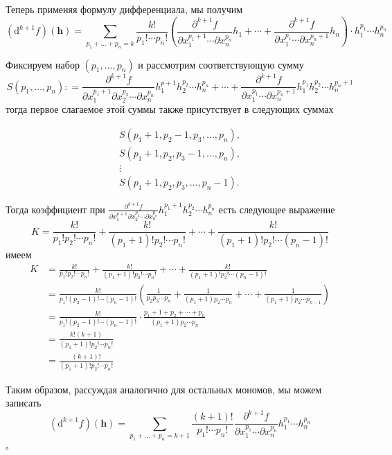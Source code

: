 \documentclass[a4paper]{article}
\newcommand{\qed}{\hfill$\square$}
\newcommand{\m}[1]{\mathbf{#1}}
\begin{document}
Теперь применяя формулу дифференциала, мы получим
$$
(\mathrm{d}^{k+1}f)(\m{h}) = \sum_{p_1 + \ldots + p_n = k} \dfrac{k!}{p_1! \cdots p_n!} \left( \frac{\partial^{k+1}f}{\partial x_1^{p_1+1} \cdots \partial x_n^{p_n}}h_1 + \cdots +  \frac{\partial^{k+1}f}{\partial x_1^{p_1} \cdots \partial x_n^{p_n+1}}h_n \right)\cdot h_1^{p_1}\cdots h_n^{p_n} 
$$

Фиксируем набор $(p_1,\ldots, p_n)$ и рассмотрим соответствующую сумму
$$
S(p_1,\ldots, p_n): = \frac{\partial^{k+1}f}{\partial x_1^{p_1+1} \partial x_2^{p_2} \cdots \partial x_n^{p_n}}h_1^{p+1}h_2^{p_2}\cdots h_n^{p_n} + \cdots +  \frac{\partial^{k+1}f}{\partial x_1^{p_1} \cdots \partial x_n^{p_n+1}}h_1^{p_1}h_2^{p_2} \cdots h_n^{p_n+1}
$$
тогда первое слагаемое этой суммы также присутствует в следующих суммах

$$
\begin{matrix}
S(p_1+1, p_2-1,p_3,\ldots, p_n), \\
S(p_1+1, p_2,p_3-1,\ldots, p_n), \\
\vdots \\
S(p_1+1, p_2,p_3,\ldots, p_n-1).
\end{matrix}
$$

Тогда коэффициент при $\frac{\partial^{k+1}f}{\partial x_1^{p+1}\partial x_2^{p_2} \cdots \partial x_n^{p_n}} h_1^{p_1+1}h_2^{p_2}\cdots h_n^{p_n}$ есть следующее выражение
$$
K = \frac{k!}{p_1! p_2! \cdots p_n!} + \frac{k!}{(p_1+1)!p_2! \cdots p_n!} + \cdots + \frac{k!}{(p_1+1)!p_2! \cdots (p_n-1)!}
$$
имеем
\begin{align*}
K &=   \frac{k!}{p_1! p_2! \cdots p_n!} + \frac{k!}{(p_1+1)!p_2! \cdots p_n!} + \cdots + \frac{k!}{(p_1+1)!p_2! \cdots (p_n-1)!} \\
&= \frac{k!}{p_1! (p_2-1)! \cdots (p_n-1)!}\left( \frac{1}{p_2p_3 \cdots p_n} + \frac{1}{(p_1+1)p_2\cdots p_n} + \cdots + \frac{1}{(p_1+1)p_2 \cdots p_{n-1}}\right) \\
&= \frac{k!}{p_1! (p_2-1)! \cdots (p_n-1)!} \cdot \frac{p_1+1 +p_2+ \cdots+ p_n}{(p_1+1)p_2\cdots p_n} \\
&= \frac{k!(k+1)}{(p_1+1)! p_2! \cdots p_n!} \\
&= \frac{(k+1)!}{(p_1+1)! p_2! \cdots p_n!}
\end{align*}

Таким образом, рассуждая аналогично для остальных мономов, мы можем записать
$$
(\mathrm{d}^{k+1}f)(\m{h}) = \sum_{p_1 + \ldots + p_n = k+1} \dfrac{(k+1)!}{p_1! \cdots p_n!} \frac{\partial^{k+1} f}{\partial x_1^{p_1} \cdots \partial x_n^{p_n}} h_1^{p_1}\cdots h_n^{p_n}
$$\qed
\end{document}

